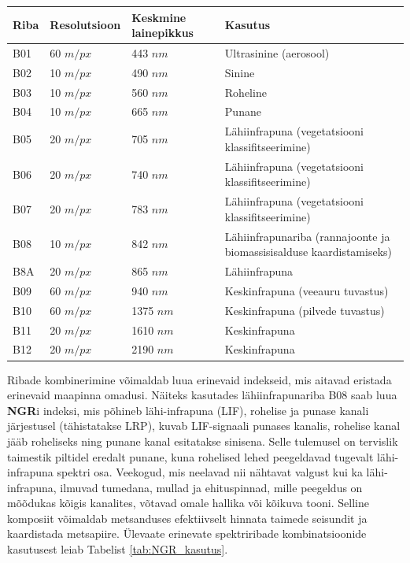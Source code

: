 \begin{table}
\caption{Sentinel-2 MSI spektriribad ja nende kasutusvaldkonnad \cite{S2Mission}.}
\label{tab:s2bands}
\begin{longtable}{p{1cm}p{1.6cm}p{1.6cm}p{9cm}}
    \hline
    Riba & Resolutsioon & Keskmine lainepikkus & Kasutus                          \\ 
    \hline
    B01  & 60 $m/px$      & 443 $nm$ & Ultrasinine (aerosool)           \\
    B02  & 10 $m/px$      & 490 $nm$ & Sinine                           \\
    B03  & 10 $m/px$      & 560 $nm$ & Roheline                         \\
    B04  & 10 $m/px$      & 665 $nm$ & Punane                           \\
    B05  & 20 $m/px$      & 705 $nm$ & Lähiinfrapuna (vegetatsiooni klassifitseerimine) \\
    B06  & 20 $m/px$      & 740 $nm$ & Lähiinfrapuna (vegetatsiooni klassifitseerimine) \\
    B07  & 20 $m/px$      & 783 $nm$ & Lähiinfrapuna (vegetatsiooni klassifitseerimine) \\
    B08  & 10 $m/px$      & 842 $nm$ & Lähiinfrapunariba (rannajoonte ja biomassisisalduse kaardistamiseks) \\
    B8A  & 20 $m/px$      & 865 $nm$ & Lähiinfrapuna  \\
    B09  & 60 $m/px$      & 940 $nm$ & Keskinfrapuna (veeauru tuvastus)                       \\
    B10  & 60 $m/px$      & 1375 $nm$ & Keskinfrapuna (pilvede tuvastus)                      \\
    B11  & 20 $m/px$      & 1610 $nm$ & Keskinfrapuna       \\
    B12  & 20 $m/px$      & 2190 $nm$ & Keskinfrapuna       \\
    \hline
\end{longtable}
\end{table}

Ribade kombinerimine võimaldab luua erinevaid indekseid, mis aitavad
eristada erinevaid maapinna omadusi. Näiteks kasutades lähiinfrapunariba B08 saab luua \textbf{NGR}i indeksi, mis põhineb lähi-infrapuna (LIF), rohelise ja punase kanali järjestusel (tähistatakse LRP), kuvab LIF-signaali punases kanalis, rohelise kanal jääb roheliseks ning punane kanal esitatakse sinisena. Selle tulemusel on tervislik taimestik piltidel eredalt punane, kuna rohelised lehed peegeldavad tugevalt lähi-infrapuna spektri osa. Veekogud, mis neelavad nii nähtavat valgust kui ka lähi-infrapuna, ilmuvad tumedana, mullad ja ehituspinnad, mille peegeldus on mõõdukas kõigis kanalites, võtavad omale hallika või kõikuva tooni. Selline komposiit võimaldab metsanduses efektiivselt hinnata taimede seisundit ja kaardistada metsapiire. Ülevaate erinevate spektriribade kombinatsioonide kasutusest leiab Tabelist \ref{tab:NGR_kasutus}.

